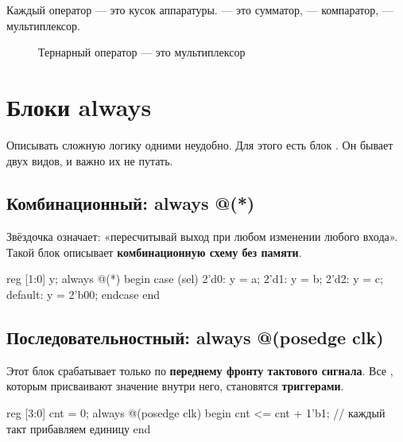Каждый оператор --- это кусок аппаратуры.  --- это сумматор,
 --- компаратор,  --- мультиплексор.

\begin{figure}[H]
\centering
{}
\caption{Тернарный оператор  --- это мультиплексор}
\end{figure}

\section{Блоки always}
\label{sec:always}

Описывать сложную логику одними  неудобно. Для этого есть блок
. Он бывает двух видов, и важно их не путать.

\subsection{Комбинационный: always @(*)}

Звёздочка означает: «пересчитывай выход при любом изменении любого входа». Такой
блок описывает \textbf{комбинационную схему без памяти}.
\begin{vcode}
reg [1:0] y;
always @(*) begin
    case (sel)
        2'd0: y = a;
        2'd1: y = b;
        2'd2: y = c;
        default: y = 2'b00;
    endcase
end
\end{vcode}

\subsection{Последовательностный: always @(posedge clk)}

Этот блок срабатывает только по \textbf{переднему фронту тактового сигнала}.
Все , которым присваивают значение внутри него, становятся
\textbf{триггерами}.
\begin{vcode}
reg [3:0] cnt = 0;
always @(posedge clk) begin
    cnt <= cnt + 1'b1;   // каждый такт прибавляем единицу
end
\end{vcode}

